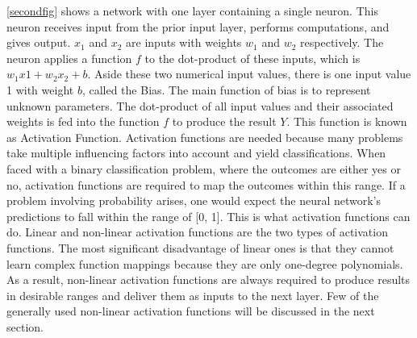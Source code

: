 \documentclass[a4paper,11pt,oneside]{book}
\begin{document}
\autoref{secondfig} shows a network with one layer containing a single neuron. This neuron receives input from the prior input layer, performs computations, and gives output. $x_1$ and $x_2$ are inputs with weights $w_1$ and $w_2$ respectively. The neuron applies a function $f$ to the dot-product of these inputs, which is $w_{1}x{1}+w_{2}x_{2}+b$.  Aside these two numerical input values, there is one input value 1 with weight $b$, called the Bias. The main function of bias is to represent unknown parameters. The dot-product of all input values and their associated weights is fed into the function $f$ to produce the result $Y$.
This function is known as Activation Function.\newline\newline
Activation functions are needed because many problems take multiple influencing factors into account and yield classifications. When faced with a binary classification problem, where the outcomes are either yes or no, activation functions are required to map the outcomes within this range. If a problem involving probability arises, one would expect the neural network's predictions to fall within the range of [0, 1]. This is what activation functions can do.\newline\newline
Linear and non-linear activation functions are the two types of activation functions. The most significant disadvantage of linear ones is that they cannot learn complex function mappings because they are only one-degree polynomials. As a result, non-linear activation functions are always required to produce results in desirable ranges and deliver them as inputs to the next layer. Few of the generally used non-linear activation functions will be discussed in the next section.
\end{document}
